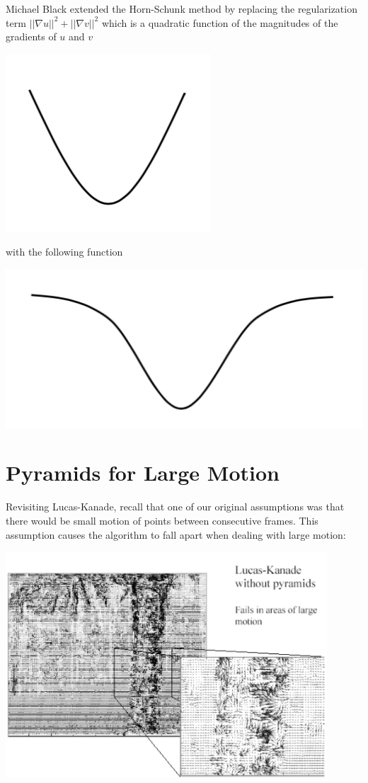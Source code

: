 \documentclass{article}
\begin{document}
Michael Black extended the Horn-Schunk method by replacing the regularization term $||\nabla u||^2+||\nabla v||^2$ which is a quadratic function of the magnitudes of the gradients of $u$ and $v$

\includegraphics{quadratic.png}

with the following function

\includegraphics{michaelblack.png}

\section{Pyramids for Large Motion}
Revisiting Lucas-Kanade, recall that one of our original assumptions was that there would be small motion of points between consecutive frames. This assumption causes the algorithm to fall apart when dealing with large motion:

\includegraphics[width=12cm]{wo_pyr.png}
\end{document}
